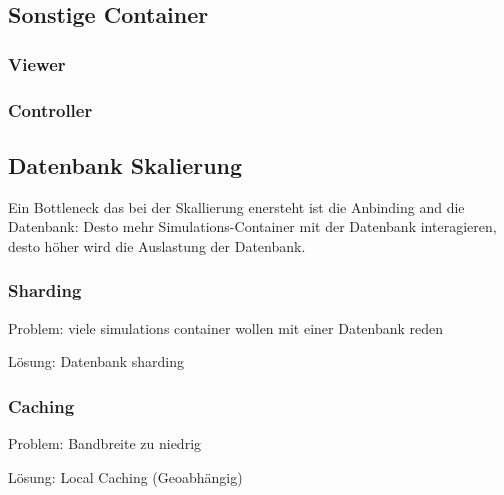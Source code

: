 \subsection{Sonstige Container}

\subsubsection{Viewer}
\subsubsection{Controller}

\subsection{Datenbank Skalierung}

Ein Bottleneck das bei der Skallierung enersteht ist die Anbinding and die Datenbank: Desto mehr Simulations-Container mit der Datenbank interagieren, desto höher wird die Auslastung der Datenbank. 

\subsubsection{Sharding}
Problem: viele simulations container wollen mit einer Datenbank reden

Lösung: Datenbank sharding

\subsubsection{Caching}
Problem: Bandbreite zu niedrig

Lösung: Local Caching (Geoabhängig)
